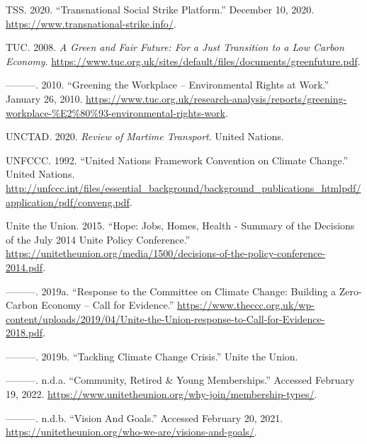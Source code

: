 \documentclass[a4paper, nobind]{templates/ociamthesis}
\newlength{\cslhangindent}
\newenvironment{CSLReferences}[2] %
 {%
  \setlength{\parindent}{0pt}
  \ifodd #1
  \let\oldpar\par
  \def\par{\hangindent=\cslhangindent\oldpar}
  \fi
  \setlength{\parskip}{1mm}
  \setlength{\baselineskip}{6mm}
 }%
 {}
\begin{document}
\begin{CSLReferences}{1}{0}
\leavevmode{}%
TSS. 2020. {``Transnational {Social Strike Platform}.''} December 10, 2020. \url{https://www.transnational-strike.info/}.

\leavevmode{}%
TUC. 2008. \emph{A {Green} and {Fair Future}: {For} a {Just Transition} to a {Low Carbon Economy}}. \url{https://www.tuc.org.uk/sites/default/files/documents/greenfuture.pdf}.

\leavevmode{}%
---------. 2010. {``Greening the Workplace -- Environmental Rights at Work.''} January 26, 2010. \url{https://www.tuc.org.uk/research-analysis/reports/greening-workplace-\%E2\%80\%93-environmental-rights-work}.

\leavevmode{}%
UNCTAD. 2020. \emph{Review of {Martime Transport}}. {United Nations}.

\leavevmode{}%
UNFCCC. 1992. {``United {Nations Framework Convention} on {Climate Change}.''} {United Nations}. \url{http://unfccc.int/files/essential_background/background_publications_htmlpdf/application/pdf/conveng.pdf}.

\leavevmode{}%
Unite the Union. 2015. {``Hope: {Jobs}, {Homes}, {Health} - {Summary} of the Decisions of the {July} 2014 {Unite Policy Conference}.''} \url{https://unitetheunion.org/media/1500/decisions-of-the-policy-conference-2014.pdf}.

\leavevmode{}%
---------. 2019a. {``Response to the {Committee} on {Climate Change}: {Building} a Zero-Carbon Economy -- {Call} for {Evidence}.''} \url{https://www.theccc.org.uk/wp-content/uploads/2019/04/Unite-the-Union-response-to-Call-for-Evidence-2018.pdf}.

\leavevmode{}%
---------. 2019b. {``Tackling {Climate Change Crisis}.''} {Unite the Union}.

\leavevmode{}%
---------. n.d.a. {``Community, {Retired} \& {Young Memberships}.''} Accessed February 19, 2022. \url{https://www.unitetheunion.org/why-join/membership-types/}.

\leavevmode{}%
---------. n.d.b. {``Vision {And Goals}.''} Accessed February 20, 2021. \url{https://unitetheunion.org/who-we-are/visions-and-goals/}.


\end{CSLReferences}
\end{document}
